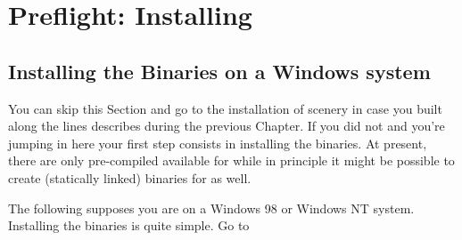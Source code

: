 
\chapter{Preflight: Installing \FlightGear \label{prefligh}}

\section{Installing the Binaries on a Windows system}
You can skip this Section and go to the installation of scenery in case you built
\FlightGear along the lines describes during the previous Chapter. If you did not and
you're jumping in here your first step consists in installing the binaries. At present,
there are only pre-compiled  available for  while in
principle it might be possible to create (statically linked) binaries for 
as well.

The following supposes you are on a Windows 98 or Windows NT system.
Installing the binaries is quite simple. Go to



